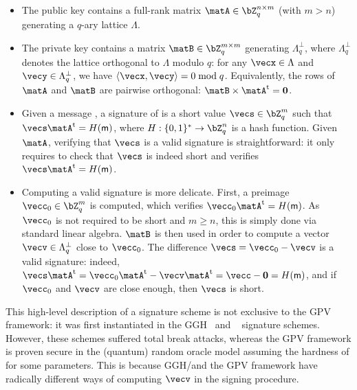 \begin{itemize}
 \item
 The public key contains a full-rank matrix $\matA \in \bZ_q^{n \times m}$ (with $m>n$) generating a $q$-ary lattice $\Lambda$.
 \item
 The private key contains a matrix $\matB \in \bZ_q^{m \times m}$ generating $\Lambda_q^\perp$, where $\Lambda_q^\perp$ denotes the lattice orthogonal to $\Lambda$ modulo $q$: for any $\vecx \in \Lambda$ and $\vecy \in \Lambda_q^\perp$, we have $\inner{\vecx}{\vecy} = 0 \bmod q$. Equivalently, the rows of $\matA$ and $\matB$ are pairwise orthogonal: $\matB \times \matA^\t = \matzero$.
 \item Given a message \msg, a signature of \msg is a short value $\vecs \in \bZ_q^m$ such that $\vecs \matA^\t = H(\msg)$, where $H : \{0,1\}^\ast \rightarrow \bZ_q^n$ is a hash function. Given $\matA$, verifying that $\vecs$ is a valid signature is straightforward: it only requires to check that $\vecs$ is indeed short and verifies $\vecs \matA^\t = H(\msg)$.
 \item Computing a valid signature is more delicate. First, a preimage $\vecc_0 \in \bZ_q^m$ is computed, which verifies $\vecc_0 \matA^\t = H(\msg)$.
 As $\vecc_0$ is not required to be short and $m \geq n$, this is simply done via standard linear algebra. $\matB$ is then used in order to compute a vector $\vecv \in \Lambda_q^\perp$ close to $\vecc_0$.
 The difference $\vecs = \vecc_0 - \vecv$ is a valid signature: indeed, $\vecs \matA^\t = \vecc_0 \matA^\t - \vecv \matA^\t = \vecc - \matzero = H(\msg)$, and if $\vecc_0$ and $\vecv$ are close enough, then $\vecs$ is short.
\end{itemize}

This high-level description of a signature scheme is not exclusive to the GPV framework: it was first instantiated in the GGH~\cite{C:GolGolHal97b} and \ntrusign~\cite{RSA:HHPSW03} signature schemes. However, these schemes suffered total break attacks, whereas the GPV framework is proven secure in the (quantum) random oracle model assuming the hardness of \sis for some parameters. This is because GGH/\ntrusign and the GPV framework have radically different ways of computing $\vecv$ in the signing procedure.

